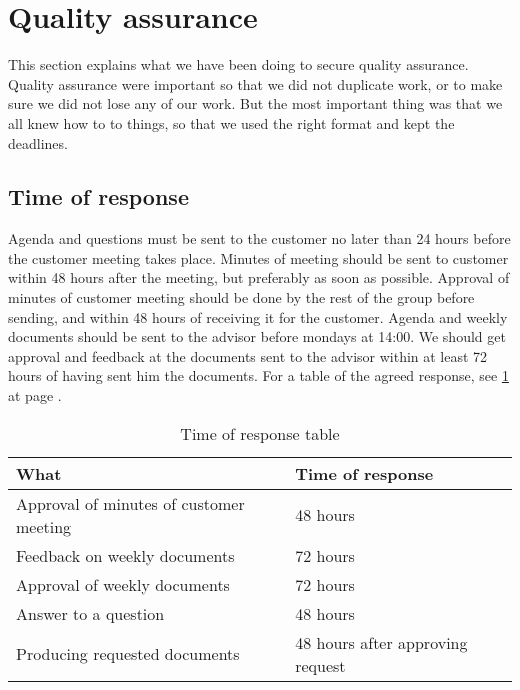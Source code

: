 \section{Quality assurance}
This section explains what we have been doing to secure quality assurance. Quality assurance were important so that we did not duplicate work, or to make sure we did not lose any of our work. But the most important thing was that we all knew how to to things, so that we used the right format and kept the deadlines.

\subsection{Time of response}
Agenda and questions must be sent to the customer no later than 24 hours before the customer meeting takes place. 
Minutes of meeting should be sent to customer within 48 hours after the meeting, but preferably as soon as possible.
Approval of minutes of customer meeting should be done by the rest of the group before sending, and within 48 hours of receiving it for the customer. Agenda and weekly documents should be sent to the advisor before mondays at 14:00.
We should get approval and feedback at the documents sent to the advisor within at least 72 hours of having sent him the documents.
\newline
\newline
For a table of the agreed response, see \ref{tab:responsetable} at page \pageref{tab:responsetable}.

\begin{table}[hbt]
\begin{center}
\begin{tabular}{l|l} \hline
What & Time of response \\ \hline \hline
Approval of minutes of customer meeting & 48 hours \\
Feedback on weekly documents & 72 hours \\
Approval of weekly documents & 72 hours \\
Answer to a question & 48 hours \\
Producing requested documents & 48 hours after approving request \\ \hline
\end{tabular}
\end{center}
\caption{Time of response table}\label{tab:responsetable}
\end{table}

\newpage

